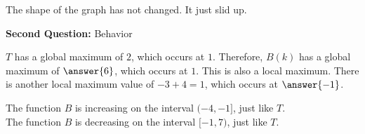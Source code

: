 \documentclass{ximera}
\begin{document}
\begin{example}
\begin{image}
\end{image}


The shape of the graph has not changed.  It just slid up.



\textbf{\textcolor{purple!85!blue}{Second Question:}}  Behavior


\begin{question}
$T$ has a global maximum of $2$, which occurs at $1$.  Therefore, $B(k)$ has a global maximum of $\answer{6}$, which occurs at $1$.  This is also a local maximum.  There is another local maximum value of $-3+4=1$, which occurs at $\answer{-1}$.
\end{question}

The function $B$ is increasing on the interval $(-4,-1]$, just like $T$. \\
The function $B$ is decreasing on the interval $[-1, 7)$, just like $T$.

\end{example}
\end{document}
